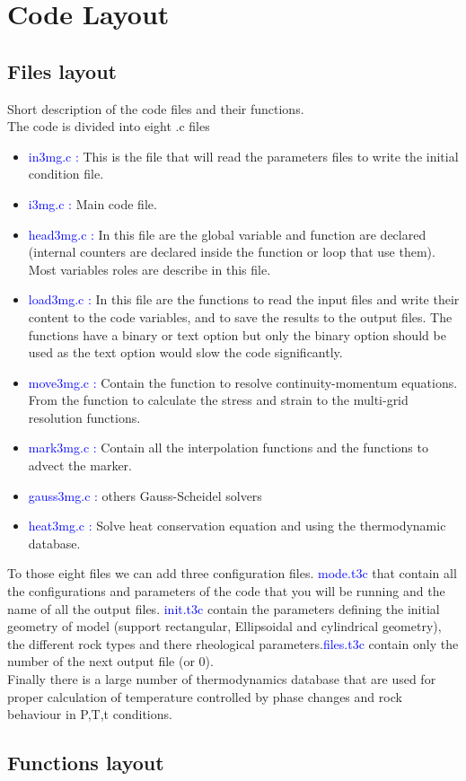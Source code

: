 
\section{Code Layout}

\subsection{Files layout}
 
Short description of the code files and their functions. \\
The code is divided into eight .c files 
   \begin{itemize}
    \item \textcolor{blue}{in3mg.c :} This is the file that will read the parameters files
    to write the initial condition file.  
    \item \textcolor{blue}{i3mg.c :} Main code file.
    \item  \textcolor{blue}{head3mg.c :} In this file are the global variable and function are declared (internal counters are declared inside the function or loop that use them). Most variables roles are describe in this file.
    \item \textcolor{blue}{load3mg.c :} In this file are the functions to read the input files and write their content to the code variables, and to save the results to the output files. The functions have a binary or text option but only the binary option should be used as the text option would slow the code significantly.
    \item \textcolor{blue}{move3mg.c :} Contain the function to resolve continuity-momentum equations. From the function to calculate the stress and strain to the multi-grid resolution functions.
    \item \textcolor{blue}{mark3mg.c :} Contain all the interpolation functions and the functions to advect the marker.
    \item \textcolor{blue}{gauss3mg.c :} others Gauss-Scheidel solvers
    \item \textcolor{blue}{heat3mg.c :} Solve heat conservation equation and using the thermodynamic database.      
    \end{itemize}
    To those eight files we can add three configuration files. \textcolor{blue}{mode.t3c} that contain all the configurations and parameters of the code that you will be running and the name of all the output files. \textcolor{blue}{init.t3c} contain the parameters defining the initial geometry of model (support rectangular, Ellipsoidal and cylindrical geometry), the different rock types and there rheological parameters.\textcolor{blue}{files.t3c} contain only the number of the next output file (or 0). \\  
Finally there is a large number of thermodynamics database that are used for proper calculation of temperature controlled by phase changes and rock behaviour in P,T,t conditions.

\subsection{Functions layout}

